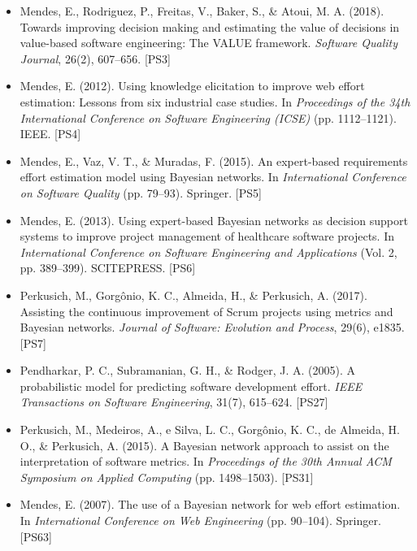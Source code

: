 \begin{itemize}
    \item Mendes, E., Rodriguez, P., Freitas, V., Baker, S., \& Atoui, M. A. (2018). Towards improving decision making and estimating the value of decisions in value-based software engineering: The VALUE framework. \textit{Software Quality Journal}, 26(2), 607--656. [PS3]
    
    \item Mendes, E. (2012). Using knowledge elicitation to improve web effort estimation: Lessons from six industrial case studies. In \textit{Proceedings of the 34th International Conference on Software Engineering (ICSE)} (pp. 1112--1121). IEEE. [PS4]
    
    \item Mendes, E., Vaz, V. T., \& Muradas, F. (2015). An expert-based requirements effort estimation model using Bayesian networks. In \textit{International Conference on Software Quality} (pp. 79--93). Springer. [PS5]
    
    \item Mendes, E. (2013). Using expert-based Bayesian networks as decision support systems to improve project management of healthcare software projects. In \textit{International Conference on Software Engineering and Applications} (Vol. 2, pp. 389--399). SCITEPRESS. [PS6]
    
    \item Perkusich, M., Gorgônio, K. C., Almeida, H., \& Perkusich, A. (2017). Assisting the continuous improvement of Scrum projects using metrics and Bayesian networks. \textit{Journal of Software: Evolution and Process}, 29(6), e1835. [PS7]
    
    \item Pendharkar, P. C., Subramanian, G. H., \& Rodger, J. A. (2005). A probabilistic model for predicting software development effort. \textit{IEEE Transactions on Software Engineering}, 31(7), 615--624. [PS27]
    
    \item Perkusich, M., Medeiros, A., e Silva, L. C., Gorgônio, K. C., de Almeida, H. O., \& Perkusich, A. (2015). A Bayesian network approach to assist on the interpretation of software metrics. In \textit{Proceedings of the 30th Annual ACM Symposium on Applied Computing} (pp. 1498--1503). [PS31]
    
    \item Mendes, E. (2007). The use of a Bayesian network for web effort estimation. In \textit{International Conference on Web Engineering} (pp. 90--104). Springer. [PS63]
\end{itemize}


